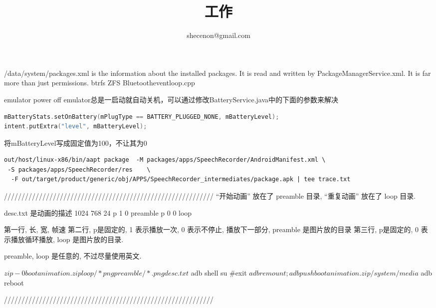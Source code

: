 \documentclass{book}
\title{工作}
\author{shecenon@gmail.com}
\begin{document}
\begin{CJK}{UTF8}{gbsn}
    \ttfamily
    \maketitle
\CJKtilde
/data/system/packages.xml is the information about the installed packages.  It is read and written by PackageManagerService.xml.  It is far more than just permissions.
btrfs ZFS
Bluetootheventloop.cpp

emulator  power off
emulator总是一启动就自动关机，可以通过修改BatteryService.java中的下面的参数来解决 
\begin{lstlisting}[language=C]
mBatteryStats.setOnBattery(mPlugType == BATTERY_PLUGGED_NONE, mBatteryLevel);
intent.putExtra("level", mBatteryLevel);
\end{lstlisting}
将mBatteryLevel写成固定值为100，不让其为0

\begin{verbatim}
out/host/linux-x86/bin/aapt package  -M packages/apps/SpeechRecorder/AndroidManifest.xml \
 -S packages/apps/SpeechRecorder/res    \
  -F out/target/product/generic/obj/APPS/SpeechRecorder_intermediates/package.apk | tee trace.txt
\end{verbatim}


////////////////////////////////////////////////////////////
“开始动画”  放在了 preamble 目录, “重复动画”  放在了 loop 目录.  

desc.txt 是动画的描述
1024 768 24
p 1 0 preamble
p 0 0 loop

第一行, 长, 宽, 帧速
第二行, p是固定的,  1 表示播放一次, 0 表示不停止, 播放下一部分,  preamble 是图片放的目录
第三行, p是固定的,  0 表示播放循环播放, loop 是图片放的目录.

preamble, loop 是任意的, 不过尽量使用英文.

$ zip -0 bootanimation.zip loop/*png preamble/*.png desc.txt
$ adb shell su
#exit
$ adb remount;adb push bootanimation.zip /system/media
$ adb reboot

////////////////////////////////////////////////////////////




\end{CJK}
\end{document}
